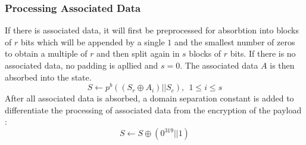 \subsubsection{Processing Associated Data}
If there is associated data, it will first be preprocessed for absorbtion into blocks of $r$ bits which will be appended by a single $1$ and the smallest number of zeros to obtain a multiple of $r$ and then split again in $s$ blocks of $r$ bits. If there is no associated data, no padding is apllied and $s=0$.
\sloppy
The associated data $A$ is then absorbed into the state.
\[
S \leftarrow p^b((S_r \oplus A_i) || S_c),\ \ 1 \leq i \leq s
\]
After all associated data is absorbed, a domain separation constant is added to differentiate the processing of associated data from the encryption of the payload \cite[Chapter 2.4.2]{DBLP:journals/joc/DobraunigEMS21}:
$$S \leftarrow S \oplus (0^{319} || 1)$$

